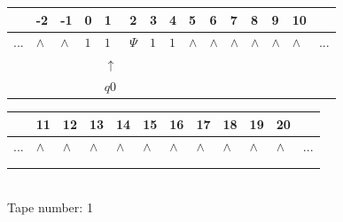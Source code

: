 \documentclass[11pt]{article}
\begin{document}
\begin{table}[H]
\centering
\begin{tabular}{lllllllllllllll}
 & -2 & -1 & 0 & 1 & 2 & 3 & 4 & 5 & 6 & 7 & 8 & 9 & 10 & \\
\hline
$...$ & \multicolumn{1}{|l|}{$\wedge$} & \multicolumn{1}{|l|}{$\wedge$} & \multicolumn{1}{|l|}{$1$} & \multicolumn{1}{|l|}{$1$} & \multicolumn{1}{|l|}{$\Psi$} & \multicolumn{1}{|l|}{$1$} & \multicolumn{1}{|l|}{$1$} & \multicolumn{1}{|l|}{$\wedge$} & \multicolumn{1}{|l|}{$\wedge$} & \multicolumn{1}{|l|}{$\wedge$} & \multicolumn{1}{|l|}{$\wedge$} & \multicolumn{1}{|l|}{$\wedge$} & \multicolumn{1}{|l|}{$\wedge$} & $...$\\
\hline
&  &  &  & $\uparrow$ &  &  &  &  &  &  &  &  &  &  \\
&  &  &  & $ q0 $ &  &  &  &  &  &  &  &  &  &  \\
\end{tabular}
\begin{tabular}{llllllllllll}
 & 11 & 12 & 13 & 14 & 15 & 16 & 17 & 18 & 19 & 20 & \\
\hline
$...$ & \multicolumn{1}{|l|}{$\wedge$} & \multicolumn{1}{|l|}{$\wedge$} & \multicolumn{1}{|l|}{$\wedge$} & \multicolumn{1}{|l|}{$\wedge$} & \multicolumn{1}{|l|}{$\wedge$} & \multicolumn{1}{|l|}{$\wedge$} & \multicolumn{1}{|l|}{$\wedge$} & \multicolumn{1}{|l|}{$\wedge$} & \multicolumn{1}{|l|}{$\wedge$} & \multicolumn{1}{|l|}{$\wedge$} & $...$\\
\hline
&  &  &  &  &  &  &  &  &  &  &  \\
&  &  &  &  &  &  &  &  &  &  &  \\
\end{tabular}
\\
Tape number: 1
\noindent\makebox[\linewidth]{\hdashrule{\textwidth}{1pt}{1pt}}\end{table}
\end{document}
